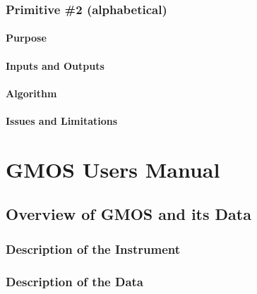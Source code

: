 \documentclass[letterpaper,10pt,english]{sphinxmanual}
\begin{document}
\subsection{Primitive \#2  (alphabetical)}
\label{GHOS/primitives_pages/primitive2:primitive-2-alphabetical}\label{GHOS/primitives_pages/primitive2:ghos-primitive-2}\label{GHOS/primitives_pages/primitive2::doc}

\subsubsection{Purpose}
\label{GHOS/primitives_pages/primitive2:purpose}

\subsubsection{Inputs and Outputs}
\label{GHOS/primitives_pages/primitive2:inputs-and-outputs}

\subsubsection{Algorithm}
\label{GHOS/primitives_pages/primitive2:algorithm}

\subsubsection{Issues and Limitations}
\label{GHOS/primitives_pages/primitive2:issues-and-limitations}

\chapter{GMOS Users Manual}
\label{GMOScontents::doc}\label{GMOScontents:gmos-users-manual}\label{GMOScontents:id1}

\section{Overview of GMOS and its Data}
\label{GMOS/instrument:gmos-instrument-overview}\label{GMOS/instrument:overview-of-gmos-and-its-data}\label{GMOS/instrument::doc}

\subsection{Description of the Instrument}
\label{GMOS/instrument:description-of-the-instrument}

\subsection{Description of the Data}
\label{GMOS/instrument:description-of-the-data}
\end{document}
